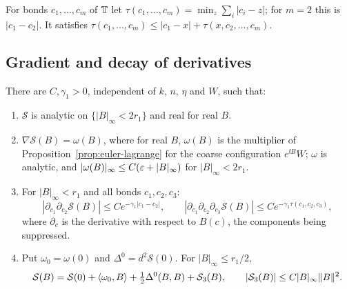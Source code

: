 For bonds $c_1,\dots,c_m$ of $\mathbb T$ let $\tau(c_1,\dots,c_m)=\min_{z}\sum_i|c_i-z|$; for $m=2$ this is $|c_1-c_2|$. It satisfies $\tau(c_1,\dots,c_m)\le|c_1-x|+\tau(x,c_2,\dots,c_m)$.

\subsection{Gradient and decay of derivatives}\label{ss:33.1}

\begin{proposition}\label{prop:coarse-action}
There are $C,\gamma_1>0$, independent of $k$, $n$, $\eta$ and $W$, such that:
\begin{enumerate}[label=(\alph*)]
\item $\mathcal S$ is analytic on $\{|B|_\infty<2r_1\}$ and real for real $B$.
\item $\nabla\mathcal S(B)=\omega(B)$, where for real $B$, $\omega(B)$ is the multiplier of Proposition~\ref{prop:euler-lagrange} for the coarse configuration $e^{\ii B}W$; $\omega$ is analytic, and $|\omega(B)|_\infty\le C(\varepsilon+|B|_\infty)$ for $|B|_\infty<2r_1$.
\item For $|B|_\infty<r_1$ and all bonds $c_1,c_2,c_3$:
\[
|\partial_{c_1}\partial_{c_2}\mathcal S(B)|\le Ce^{-\gamma_1|c_1-c_2|},\qquad|\partial_{c_1}\partial_{c_2}\partial_{c_3}\mathcal S(B)|\le Ce^{-\gamma_1\tau(c_1,c_2,c_3)},
\]
where $\partial_c$ is the derivative with respect to $B(c)$, the components being suppressed.
\item Put $\omega_0=\omega(0)$ and $\Delta^0=d^2\mathcal S(0)$. For $|B|_\infty\le r_1/2$,
\[
\mathcal S(B)=\mathcal S(0)+\langle \omega_0,B\rangle+\tfrac12\Delta^0(B,B)+\mathcal S_3(B),\qquad|\mathcal S_3(B)|\le C|B|_\infty\|B\|^2 .
\]
\end{enumerate}
\end{proposition}

